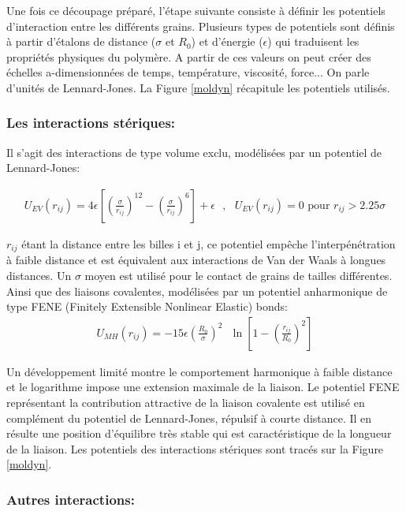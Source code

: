 \documentclass[a4paper,11pt]{article}
\begin{document}
Une fois ce découpage préparé, l'étape suivante consiste à définir les potentiels d'interaction entre les différents grains. Plusieurs types de potentiels sont définis à partir d'étalons de distance ($\sigma$ et $R_0$) et d'énergie ($\epsilon$) qui traduisent les propriétés physiques du polymère. A partir de ces valeurs on peut créer des échelles a-dimensionnées de temps, température, viscosité, force... On parle d'unités de Lennard-Jones. La Figure \ref{moldyn} récapitule les potentiels utilisés.

\subsubsection*{Les interactions stériques:}

Il s'agit des interactions de type volume exclu, modélisées par un potentiel de Lennard-Jones:

\begin{eqnarray}
U_{EV}(r_{ij})= 4\epsilon \left[\left(\frac{\sigma}{r_{ij}}\right)^{12}-\left(\frac{\sigma}{r_{ij}}\right)^{6}\right] + \epsilon \text{ }, \text{ } U_{EV}(r_{ij})=0 \text{ pour }  r_{ij}> 2.25 \sigma
\end{eqnarray}

$r_{ij}$ étant la distance entre les billes i et j, ce potentiel empêche l'interpénétration à faible distance et est équivalent aux interactions de Van der Waals à longues distances. Un $\sigma$ moyen est utilisé pour le contact de grains de tailles différentes.\\

Ainsi que des liaisons covalentes, modélisées par un potentiel anharmonique de type FENE (Finitely Extensible Nonlinear Elastic) bonds:
\begin{eqnarray}
U_{MH}(r_{ij})= -15\epsilon \left(\frac{R_0}{\sigma}\right)^2\text{ } \ln\left[1-\left(\frac{r_{ij}}{R_0}\right)^2\right]
\end{eqnarray}


Un développement limité montre le comportement harmonique à faible distance et le logarithme impose une extension maximale de la liaison. Le potentiel FENE représentant la contribution attractive de la liaison covalente est utilisé en complément du potentiel de Lennard-Jones, répulsif à courte distance. Il en résulte une position d'équilibre très stable qui est caractéristique de la longueur de la liaison. Les potentiels des interactions stériques sont tracés sur la Figure \ref{moldyn}.


\subsubsection*{Autres interactions:}
\end{document}
